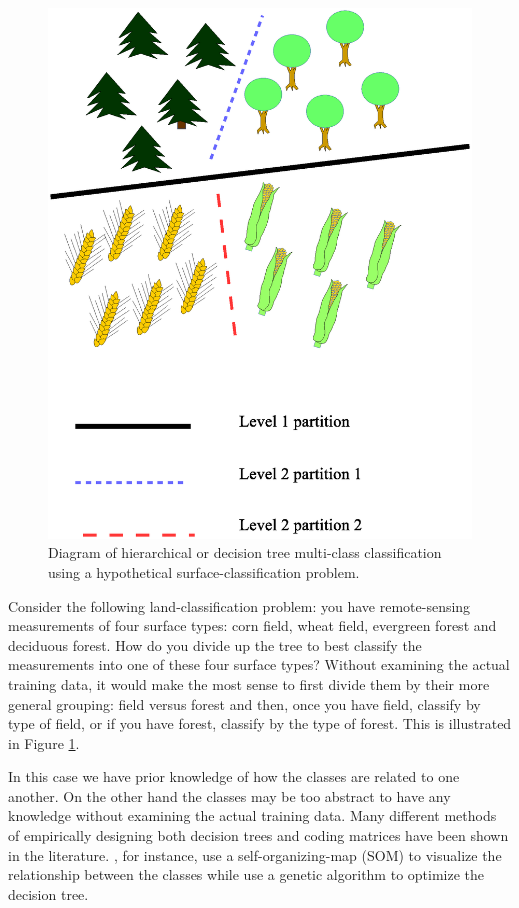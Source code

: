\begin{figure}
	\includegraphics[width=1\textwidth]{landclasstree.eps}
	\caption{Diagram of hierarchical or decision tree multi-class classification using a hypothetical surface-classification problem.}
	\label{landclasstree}
\end{figure}

Consider the following land-classification problem: you have remote-sensing measurements of four surface types: corn field, wheat field, evergreen forest and deciduous forest.
How do you divide up the tree to best classify the measurements into one of these four surface types?
Without examining the actual training data, it would make the most sense to first divide them by their more general grouping: field versus forest and then, once you have field, classify by type of field, or if you have forest, classify by the type of forest.
This is illustrated in Figure \ref{landclasstree}.

In this case we have prior knowledge of how the classes are related to one another.
On the other hand the classes may be too abstract to have any knowledge without examining the actual training data.
Many different methods of empirically designing both decision trees and coding matrices have been shown in the literature.
\citet{Cheong_etal2004}, for instance, use a self-organizing-map (SOM)
\citep{Kohonen2000} to visualize the relationship between the classes while
\citet{Lee_Oh2003} use a genetic algorithm to optimize the decision tree.


